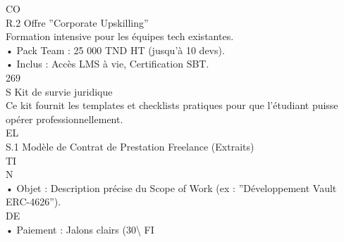 \documentclass[12pt,landscape,a4paper]{article}
\begin{document}
CO\\
R.2    Offre ”Corporate Upskilling”\\
Formation intensive pour les équipes tech existantes.\\
\vspace{0.5em}
• Pack Team : 25 000 TND HT (jusqu’à 10 devs).\\
\vspace{0.5em}
• Inclus : Accès LMS à vie, Certification SBT.\\
\vspace{0.5em}
\vspace{0.5em}
\vspace{0.5em}
\vspace{0.5em}
269\\
S \textbar{} Kit de survie juridique\\
\vspace{0.5em}
\vspace{0.5em}
Ce kit fournit les templates et checklists pratiques pour que l’étudiant puisse opérer professionnellement.\\
\vspace{0.5em}
\vspace{0.5em}
\vspace{0.5em}
\vspace{0.5em}
EL\\
S.1 Modèle de Contrat de Prestation Freelance (Extraits)\\
\vspace{0.5em}
\vspace{0.5em}
\vspace{0.5em}
\vspace{0.5em}
TI\\
N\\
• Objet : Description précise du Scope of Work (ex : ”Développement Vault ERC-4626”).\\
\vspace{0.5em}
\vspace{0.5em}
\vspace{0.5em}
\vspace{0.5em}
DE\\
• Paiement : Jalons clairs (30\textbackslash{}%
\vspace{0.5em}
\vspace{0.5em}
\vspace{0.5em}
\vspace{0.5em}
FI\\
\end{document}
